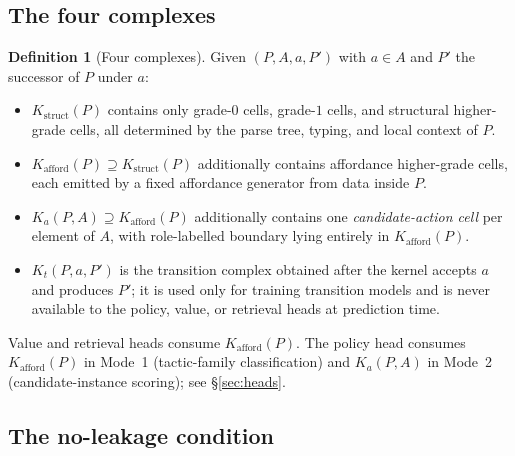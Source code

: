 \documentclass[11pt]{article}
\theoremstyle{definition}
\newtheorem{definition}{Definition}[section]
\theoremstyle{plain}
\newcommand{\Kstruct}{K_{\mathrm{struct}}}
\newcommand{\Kafford}{K_{\mathrm{afford}}}
\begin{document}
\subsection{The four complexes}

\begin{definition}[Four complexes]\label{def:four}
Given $(P, A, a, P')$ with $a \in A$ and $P'$ the successor of $P$ under $a$:
\begin{itemize}
\item $\Kstruct(P)$ contains only grade-$0$ cells, grade-$1$ cells, and structural higher-grade cells, all determined by the parse tree, typing, and local context of $P$.
\item $\Kafford(P) \supseteq \Kstruct(P)$ additionally contains affordance higher-grade cells, each emitted by a fixed affordance generator from data inside $P$.
\item $K_a(P, A) \supseteq \Kafford(P)$ additionally contains one \emph{candidate-action cell} per element of $A$, with role-labelled boundary lying entirely in $\Kafford(P)$.
\item $K_t(P, a, P')$ is the transition complex obtained after the kernel accepts $a$ and produces $P'$; it is used only for training transition models and is never available to the policy, value, or retrieval heads at prediction time.
\end{itemize}
\end{definition}

Value and retrieval heads consume $\Kafford(P)$. The policy head consumes $\Kafford(P)$ in Mode~1 (tactic-family classification) and $K_a(P, A)$ in Mode~2 (candidate-instance scoring); see \S\ref{sec:heads}.

\subsection{The no-leakage condition}\label{sec:noleak}
\end{document}
